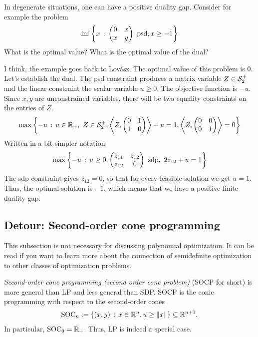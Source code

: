 \begin{exercise}
	In degenerate situations, one can have a positive duality gap. Consider for example the problem
	\[
		\inf \setcond{x}{ \begin{pmatrix} 0 & x \\ x & y \end{pmatrix} \ \text{psd}, x  \ge -1 }
	\]
	What is the optimal value? What is the optimal value of the dual?
\end{exercise}
\begin{solution}
	I think, the example goes back to Lov\'asz. 
	The optimal value of this problem is $0$. 
Let's establish the dual. The psd constraint produces a matrix variable $Z \in \mathcal{S}_2^+$ and the linear constraint the scalar variable $u \ge 0$. The objective function is $-u$. Since $x, y$ are unconstrained variables, there will be two equality constraints on the entries of $Z$. 
\[
\max \left\{ -u \,:\, u \in \mathbb{R}_+, \ Z \in \mathcal{S}_2^+,  \left\langle Z , \begin{pmatrix} 0 & 1 \\ 1 & 0 \end{pmatrix}  \right\rangle + u =  1, \left\langle Z , \begin{pmatrix} 0 & 0 \\ 0 & 1 \end{pmatrix}  \right\rangle =  0 \right\}
\]
Written in a bit simpler notation 
\[
\max \left\{ -u \,:\, u \ge 0, \begin{pmatrix} z_{11} & z_{12} \\ z_{12} & 0 \end{pmatrix} \ \text{sdp}, \ 2 z_{12} + u = 1 \right\}
\]
The sdp constraint gives $z_{12} = 0$, so that for every feasible solution we get $u=1$. Thus, the optimal solution is $-1$, which means that we have a positive finite duality gap. 
\end{solution}


\subsection{Detour: Second-order cone programming}

\label{soc:programming}

This subsection is not necessary for discussing polynomial optimization. It can be read if you want to learn more about the connection of semidefinite optimization to other classes of optimization problems. 

	\emph{Second-order cone programming (second order cone problem)} (SOCP for short) is more general than LP and less general than SDP. SOCP is the conic programming with respect to the second-order cones 
	\[
		\operatorname{SOC}_{n}:=\left\{ (x,y) \,:\, x \in \mathbb{R}^n, u \ge \|x \| \right\} \subseteq \mathbb{R}^{n+1}.
	\]
	In particular, $\operatorname{SOC}_0=\mathbb{R}_+$. Thus, LP is indeed a special case.
	
